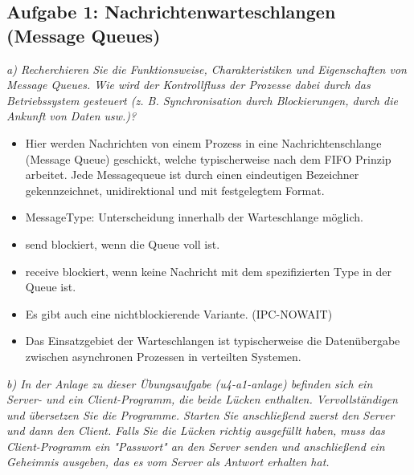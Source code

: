 \documentclass[a4paper]{article}
\begin{document}
\subsection{Aufgabe 1: Nachrichtenwarteschlangen (Message Queues)}
\textit{a) Recherchieren Sie die Funktionsweise, Charakteristiken und Eigenschaften von Message Queues. Wie wird der Kontrollfluss der Prozesse dabei durch das Betriebssystem gesteuert (z. B. Synchronisation durch Blockierungen, durch die Ankunft von Daten usw.)?}
\vspace{10mm}
\begin{itemize}
    \item Hier werden Nachrichten von einem Prozess in eine Nachrichtenschlange (Message Queue) geschickt, welche typischerweise nach dem FIFO Prinzip arbeitet. Jede Messagequeue ist durch einen eindeutigen Bezeichner gekennzeichnet, unidirektional und mit festgelegtem Format. 
    \item MessageType: Unterscheidung innerhalb der Warteschlange möglich. 
    \item send blockiert, wenn die Queue voll ist. 
    \item receive blockiert, wenn keine Nachricht mit dem spezifizierten Type in der Queue ist.
    \item Es gibt auch eine nichtblockierende Variante. (IPC-NOWAIT)
    \item Das Einsatzgebiet der Warteschlangen ist typischerweise die Datenübergabe zwischen asynchronen Prozessen in verteilten Systemen.
\end{itemize}

\textit{b) In der Anlage zu dieser Übungsaufgabe (u4-a1-anlage) befinden sich ein Server- und ein Client-Programm, die beide Lücken enthalten. Vervollständigen und übersetzen Sie die Programme. Starten Sie anschließend zuerst den Server und dann den Client. Falls Sie die Lücken richtig ausgefüllt haben, muss das Client-Programm ein "Passwort" an den Server senden und anschließend ein Geheimnis ausgeben, das es vom Server als Antwort erhalten hat.}
\vspace{10mm}

\end{document}
